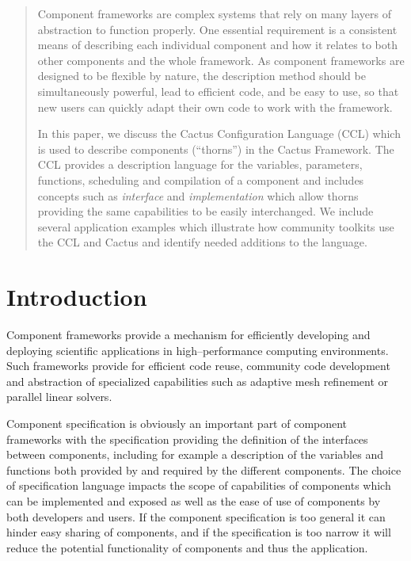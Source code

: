 \documentclass[conference]{IEEEtran}
\begin{document}
\begin{abstract}
Component frameworks are complex systems that rely on many layers of abstraction to function
properly. One essential requirement is a consistent means of describing each individual component
and how it relates to both other components and the whole framework. As component frameworks
are designed to be flexible by nature, the description method should be simultaneously powerful, 
lead to efficient code,  
and be easy to use,
so that new users can quickly adapt their own code to work with the
framework.  

In this paper, we discuss the Cactus Configuration Language (CCL) which is used to describe 
components (``thorns'') in the Cactus Framework. The CCL provides a description language
for the variables, parameters, functions, scheduling and compilation of a component and 
includes concepts such as {\it interface} and {\it implementation} which allow thorns providing the same 
capabilities to be easily interchanged. We include several application examples 
which illustrate how community toolkits use the CCL and Cactus and identify
needed additions to the language.
\end{abstract}







\IEEEpeerreviewmaketitle




\section{Introduction}

Component frameworks provide a mechanism for efficiently developing and deploying 
scientific applications in high--performance computing environments. Such frameworks provide 
for efficient code reuse, community code development and abstraction of specialized capabilities such 
as adaptive mesh refinement or parallel linear solvers. 

Component specification is obviously an important part  of component frameworks with the specification
providing the definition of the interfaces between components, including for example a description of
the variables and functions both provided by and required by the different components. The choice of 
specification language impacts the scope of capabilities of components which can be implemented and exposed 
as well as the ease of use of 
components by both developers and users. If the component specification is too general it can hinder easy sharing of components, and if the 
specification is too narrow it will reduce the potential functionality of components and thus the application.
\end{document}
